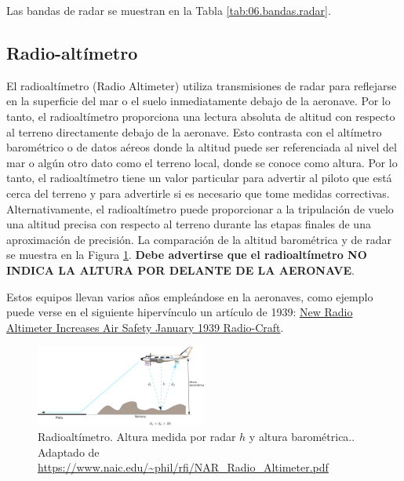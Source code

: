 Las bandas de radar se muestran en la Tabla \ref{tab:06.bandas.radar}.

\subsection{Radio-alt\'imetro}
\label{sec:U06.05.radio.altimetro}

El radioalt\'imetro (Radio Altimeter) utiliza transmisiones de radar para reflejarse en la superficie del mar o el suelo inmediatamente debajo de la aeronave. Por lo tanto, el radioalt\'imetro proporciona una lectura absoluta de altitud con respecto al terreno directamente debajo de la aeronave. Esto contrasta con el altímetro barométrico o de datos aéreos donde la altitud puede ser referenciada al nivel del mar o algún otro dato como el terreno local, donde se conoce como altura. Por lo tanto, el radioalt\'imetro tiene un valor particular para advertir al piloto que está cerca del terreno y para advertirle si es necesario que tome medidas correctivas. Alternativamente, el radioalt\'imetro puede proporcionar a la tripulación de vuelo una altitud precisa con respecto al terreno durante las etapas finales de una aproximación de precisión. La comparación de la altitud barométrica y de radar se muestra en la Figura \ref{fig:radioaltimetro.funcionamiento}. \textbf{Debe advertirse que el radioalt\'imetro NO INDICA LA ALTURA POR DELANTE DE LA AERONAVE}.

Estos equipos llevan varios a\~nos emple\'andose en la aeronaves, como ejemplo puede verse en el siguiente hiperv\'inculo un art\'iculo de 1939: 
\href{https://www.rfcafe.com/references/radio-craft/radio-altimeter-increases-air-safety-january-1939-radio-craft.htm}{New Radio Altimeter Increases Air Safety
January 1939 Radio-Craft}. 

\begin{figure}[!h]
  \centering
    \includegraphics[width=0.5\textwidth]{06.radionavegacion/Imagenes/06.05.radar/06_radar_0000.png}
  \caption{Radioalt\'imetro. Altura medida por radar $h$ y altura barom\'etrica.. \\{\tiny Adaptado de \,\url{https://www.naic.edu/~phil/rfi/NAR_Radio_Altimeter.pdf}}}
  \label{fig:radioaltimetro.funcionamiento}
\end{figure}


